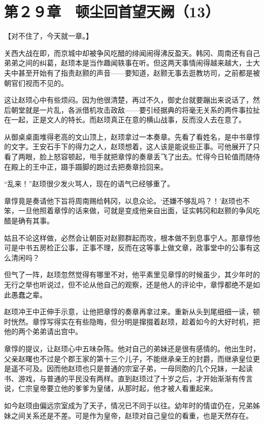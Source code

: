 \section{第２９章　顿尘回首望天阙（13）}

【对不住了，今天就一章。】

关西大战在即，而京城中却被争风吃醋的绯闻闹得沸反盈天。韩冈、周南还有自己弟弟之间的纠葛，赵顼本是当作趣闻轶事在听。但这两天事情闹得越来越大，士大夫中甚至开始有了指责赵颢的声音——要知道，赵颢无事去逛教坊司，之前都是被朝官们视而不见的。

这让赵顼心中有些烦闷。因为他很清楚，再过不久，御史台就要蹦出来说话了，然后朝堂就是一片乱，各派借机攻击政敌——要引经据典的将毫无关系的两件事拉扯在一起，正是文人的特长。而赵顼真正在意的横山战事，反而没人去在意了。

从御桌桌面堆得老高的文山顶上，赵顼拿过一本奏章。先看了看姓名，是中书章惇的文字。王安石手下的得力之人，赵顼想着，这人该是能说些正事。可他展开了只看了两眼，脸上怒容顿起，甩手就把章惇的奏章丢飞了出去。忙得今日轮值而随侍在殿上的王中正，蹑手蹑脚的跑过去把奏章捡回来。

“乱来！”赵顼很少发火骂人，现在的语气已经够重了。

章惇竟是奏请他下旨将周南赐给韩冈，以息众论。‘还嫌不够乱吗？！’赵顼也不笨，一旦他照着章惇的话来做，可就是变成他亲自出面，证实韩冈和赵颢的争风吃醋是确有其事。

姑且不论这样做，必然会让朝臣对赵颢群起而攻，根本做不到息事宁人。那章惇他可是中书五房检正公事，正事不理，反而在这等事上做文章，政事堂中的公事有这么清闲吗？

但气了一阵，赵顼忽然觉得有哪里不对，他平素里见章惇的时候虽少，其少年时的无行之举也听说过，但不论从他自己的观察，还是他人的评论中，章惇都绝不是如此愚蠢之辈。

赵顼冲王中正伸手示意，让他把章惇的奏章再拿过来。重新从头到尾细细一读，顿时恍然。章惇写得实在有些隐晦，但分明是撺掇着赵顼，趁着如今的大好时机，把他的两个弟弟请出宫中。

章惇的提议，让赵顼心中五味杂陈。他对自己的弟妹还是很有感情的。他出生时，父亲赵曙也不过是个郡王家的第十三个儿子，不能继承亲王的封爵，而继承皇位更是遥不可及。因而他赵顼也只是普通的宗室子弟，一母同胞的几个兄妹，一起读书、游戏，与普通的平民没有两样。直到赵顼过了十岁之后，才开始渐渐有传言说，仁宗皇帝要立他的爹爹为皇储，从那时起，他才被人看重起来。

如今赵顼由偏远宗室成为了天子，情况已不同于以往。幼年时的情谊仍在，兄弟姊妹之间关系还是不差。可是作为皇帝，赵顼对自己皇位的看重，也是天然存在。

